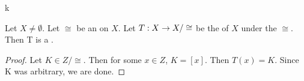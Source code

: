k\label{prop:QuotientMapSurjective}
\begin{prop}
    Let $X \neq \emptyset$. 
    Let $\cong$ be an 
	\EquivalenceRelation on 
	$X$.
    Let $T : X\to X/\cong$  be the 
	\QuotientMap of $X$ under the 
	\Relation
	$\cong$. 
    Then T is a 
	\Surjection. 
    \begin{proof}
       Let $K \in Z/\cong$. 
       Then for some $x \in Z$, $K=[x]$. 
       Then $T(x) = K$. 
       Since K was arbitrary, we are done. 
    \end{proof}
\end{prop} 
